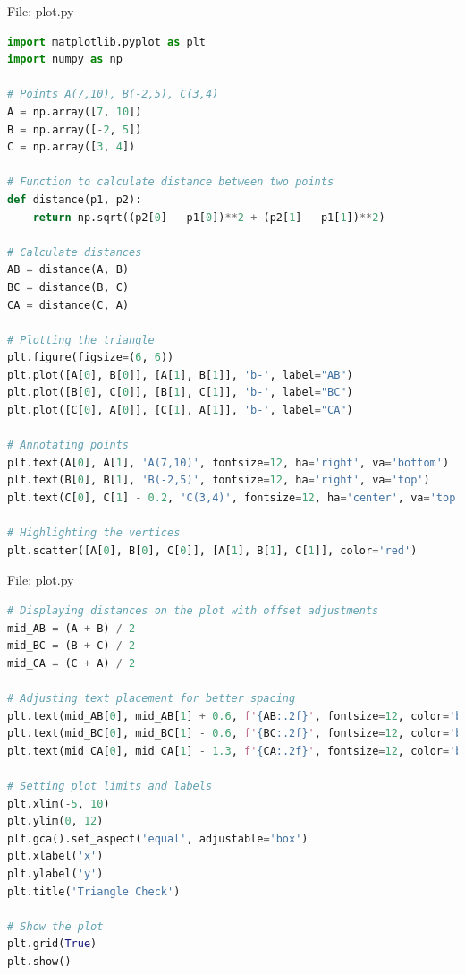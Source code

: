 \documentclass{beamer}
\numberwithin{equation}{section}
\theoremstyle{remark}
\begin{document}
\begin{frame}[fragile]{File: plot.py}
\begin{lstlisting}[language=Python]
import matplotlib.pyplot as plt
import numpy as np

# Points A(7,10), B(-2,5), C(3,4)
A = np.array([7, 10])
B = np.array([-2, 5])
C = np.array([3, 4])

# Function to calculate distance between two points
def distance(p1, p2):
    return np.sqrt((p2[0] - p1[0])**2 + (p2[1] - p1[1])**2)

# Calculate distances
AB = distance(A, B)
BC = distance(B, C)
CA = distance(C, A)

# Plotting the triangle
plt.figure(figsize=(6, 6))
plt.plot([A[0], B[0]], [A[1], B[1]], 'b-', label="AB")
plt.plot([B[0], C[0]], [B[1], C[1]], 'b-', label="BC")
plt.plot([C[0], A[0]], [C[1], A[1]], 'b-', label="CA")

# Annotating points
plt.text(A[0], A[1], 'A(7,10)', fontsize=12, ha='right', va='bottom')
plt.text(B[0], B[1], 'B(-2,5)', fontsize=12, ha='right', va='top')
plt.text(C[0], C[1] - 0.2, 'C(3,4)', fontsize=12, ha='center', va='top')

# Highlighting the vertices
plt.scatter([A[0], B[0], C[0]], [A[1], B[1], C[1]], color='red')
\end{lstlisting}
\end{frame}

\begin{frame}[fragile]{File: plot.py}
\begin{lstlisting}[language=Python]
# Displaying distances on the plot with offset adjustments
mid_AB = (A + B) / 2
mid_BC = (B + C) / 2
mid_CA = (C + A) / 2

# Adjusting text placement for better spacing
plt.text(mid_AB[0], mid_AB[1] + 0.6, f'{AB:.2f}', fontsize=12, color='blue', ha='center')
plt.text(mid_BC[0], mid_BC[1] - 0.6, f'{BC:.2f}', fontsize=12, color='blue', ha='center')
plt.text(mid_CA[0], mid_CA[1] - 1.3, f'{CA:.2f}', fontsize=12, color='blue', ha='center')

# Setting plot limits and labels
plt.xlim(-5, 10)
plt.ylim(0, 12)
plt.gca().set_aspect('equal', adjustable='box')
plt.xlabel('x')
plt.ylabel('y')
plt.title('Triangle Check')

# Show the plot
plt.grid(True)
plt.show()
\end{lstlisting}
\end{frame}
\end{document}
